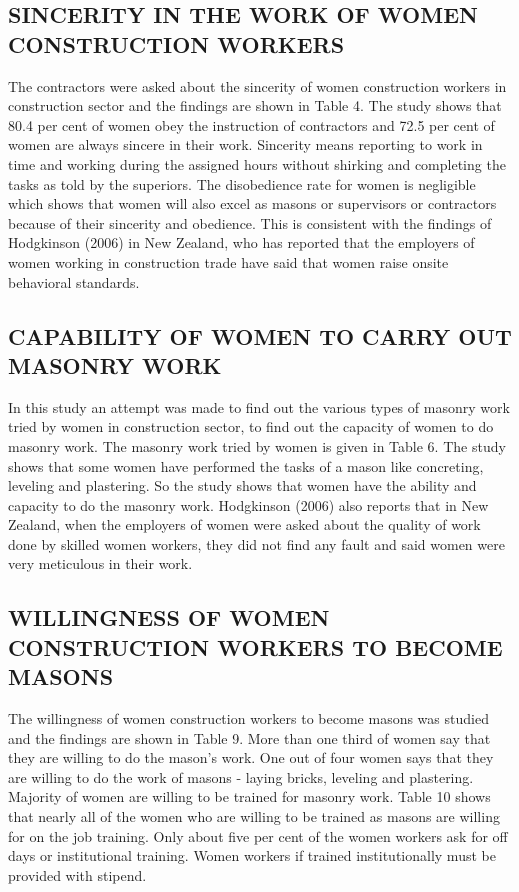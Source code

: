 \documentclass[12pt]{report}
\begin{document}
	   
	\subsection{SINCERITY  IN  THE  WORK  OF  WOMEN  CONSTRUCTION  WORKERS }
	The  contractors  were  asked  about  the  sincerity  of  women  construction  workers  in construction  sector  and  the  findings  are  shown  in  Table  4.    The  study  shows  that  80.4  per cent  of  women  obey  the  instruction  of  contractors  and  72.5  per  cent  of  women  are  always sincere  in  their  work.  Sincerity  means  reporting  to  work  in  time  and  working  during  the assigned  hours  without  shirking  and  completing  the  tasks  as  told  by  the  superiors.      The disobedience  rate  for  women  is  negligible  which  shows  that  women  will  also  excel  as masons  or  supervisors  or  contractors  because  of  their  sincerity  and  obedience.  This  is consistent  with  the  findings  of  Hodgkinson  (2006)  in  New  Zealand,  who  has  reported  that the  employers  of  women  working  in  construction  trade  have  said  that  women  raise  onsite behavioral  standards.   
	
	\subsection{CAPABILITY  OF  WOMEN  TO  CARRY  OUT  MASONRY  WORK}
	In  this  study  an  attempt  was  made  to  find  out  the  various  types  of  masonry  work tried  by  women  in  construction  sector,  to  find  out  the  capacity  of  women  to  do  masonry work.  The  masonry  work  tried  by  women  is  given  in  Table  6.   The  study  shows  that  some  women  have  performed  the  tasks  of  a  mason  like concreting,  leveling  and  plastering.  So  the  study  shows  that  women  have  the  ability  and capacity  to  do  the  masonry  work.  Hodgkinson  (2006)  also  reports  that  in  New  Zealand, when  the  employers  of  women  were  asked  about  the  quality  of  work  done  by  skilled women  workers,  they  did  not  find  any  fault  and  said  women  were  very  meticulous  in their  work. 
	 
	\subsection{WILLINGNESS  OF  WOMEN  CONSTRUCTION  WORKERS  TO  BECOME  MASONS}
	The  willingness  of  women  construction  workers  to  become  masons  was  studied and  the  findings  are  shown  in  Table  9.  More  than  one  third  of  women  say  that  they  are willing  to  do  the  mason’s  work.  One  out  of  four  women  says  that  they  are  willing  to  do the  work  of  masons  -  laying  bricks,  leveling  and  plastering.  Majority  of  women  are willing  to  be  trained  for  masonry  work.   Table  10  shows  that  nearly  all  of  the  women  who  are  willing  to  be  trained  as masons  are  willing  for  on  the  job  training.  Only  about  five  per  cent  of  the  women workers  ask  for  off  days  or  institutional  training.  Women  workers  if  trained institutionally  must  be  provided  with  stipend. 
	
\end{document}
